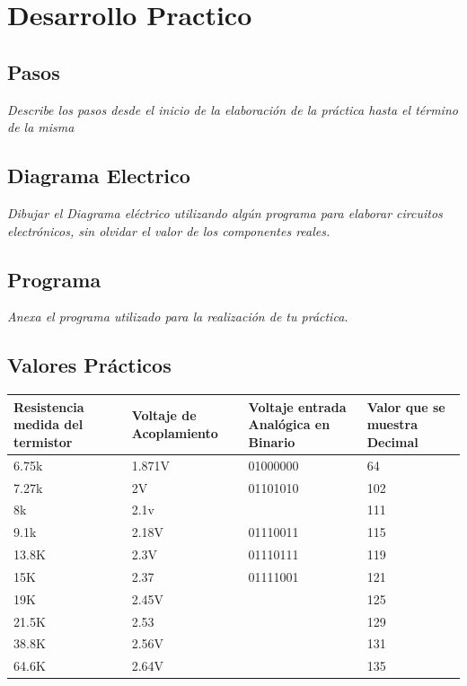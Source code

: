 \documentclass[11pt]{scrartcl}
\newcommand{\indicacion}[1]{\noindent\textit{\small #1}}
\begin{document}
\section{Desarrollo Practico}

\subsection{Pasos}
\indicacion{
    Describe los pasos desde el inicio de la elaboración de la práctica hasta el término de la misma
}

\subsection{Diagrama Electrico}
\indicacion{
    Dibujar el Diagrama eléctrico utilizando algún programa para elaborar circuitos electrónicos, sin olvidar el valor de los componentes reales.
}

\subsection{Programa}

\indicacion{
    Anexa el programa utilizado para la realización de tu práctica.
}


\subsection{Valores Prácticos}
\begin{center}
\begin{tabular}{|p{4cm}|p{4cm}|p{4cm}|p{4cm}|}
\hline
\textbf{Resistencia medida del termistor}& \textbf{Voltaje de Acoplamiento} & \textbf{Voltaje entrada Analógica en Binario} & \textbf{Valor que se muestra Decimal}\\
\hline
6.75k & 1.871V& 01000000 &64 \\[4px]
\hline
7.27k & 2V & 01101010& 102 \\[4px]
\hline
8k &2.1v & &111 \\[4px]
\hline
9.1k& 2.18V&01110011 &115 \\[4px]
\hline
13.8K& 2.3V& 01110111& 119\\[4px]
\hline
15K& 2.37& 01111001 & 121 \\[4px]
\hline
19K& 2.45V& & 125 \\[4px]
\hline
21.5K& 2.53& &129 \\[4px]
\hline
38.8K& 2.56V& & 131\\[4px]
\hline
64.6K& 2.64V& & 135\\[4px]
\hline
\end{tabular}
\end{center}
\end{document}
